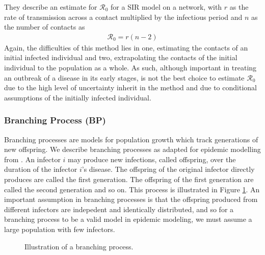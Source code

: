 \documentclass[12pt]{article}
\newcommand{\rr}{\ensuremath{\mathcal{R}_0}}
\begin{document}
They describe an estimate for $\rr$ for a SIR model on a network, with $r$ as the rate of transmission across a contact multiplied by the infectious period and $n$ as the number of contacts as
\begin{align*}
\rr = r(n-2)
\end{align*}
Again, the difficulties of this method lies in one, estimating the contacts of an initial infected individual and two, extrapolating the contacts of the initial individual to the population as a whole.  As such, although important in treating an outbreak of a disease in its early stages, is not the best choice to estimate $\rr$ due to the high level of uncertainty inherit in the method and due to conditional assumptions of the initially infected individual.



\subsubsection{Branching Process (BP)}
\label{sec:branching-process}

Branching processes are models for population growth which track generations of new offspring.  We describe branching processes as adapted for epidemic modelling from \cite{grimmett1992}.  An infector $i$ may produce new infections, called offspring, over the duration of the  infector $i$'s disease.  The offspring of the original infector directly produces are called the first generation.  The offspring of the first generation are called the second generation and so on.  This process is illustrated in Figure \ref{fig:bp}.  An important assumption in branching processes is that the offspring produced from different infectors are indepedent and identically distributed, and so for a branching process to be a valid model in epidemic modeling, we must assume a large population with few infectors.

\begin{figure}
  \centering
{}
\caption{Illustration of a branching process.}\label{fig:bp}
\end{figure}
\end{document}
